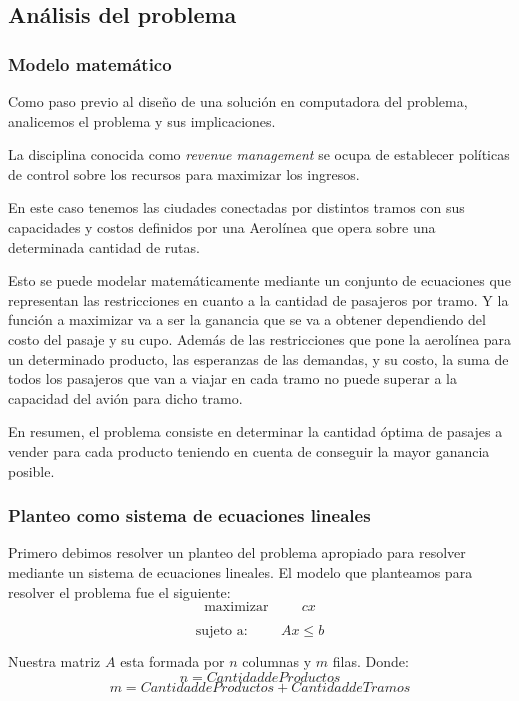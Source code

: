 \subsection{An\'alisis del problema}

\subsubsection{Modelo matem\'atico}

Como paso previo al dise\~no de una soluci\'on en computadora del problema, analicemos el problema y sus implicaciones.

La disciplina conocida como \emph{revenue management} se ocupa de establecer pol\'iticas de control sobre los recursos para maximizar los ingresos.

En este caso tenemos las ciudades conectadas por distintos tramos con sus capacidades y costos definidos por una Aerol\'inea que opera sobre una determinada cantidad de rutas.

Esto se puede modelar matem\'aticamente mediante un conjunto de ecuaciones que representan las restricciones en cuanto a la cantidad de pasajeros por tramo. Y la funci\'on a maximizar va a ser la ganancia que se va a obtener dependiendo del costo del pasaje y su cupo.
Adem\'as de las restricciones que pone la aerol\'inea para un determinado producto, las esperanzas de las demandas, y su costo, la suma de todos los pasajeros que van a viajar en cada tramo no puede superar a la capacidad del avi\'on para dicho tramo.

En resumen, el problema consiste en determinar la cantidad \'optima de pasajes a vender para cada producto teniendo en cuenta de conseguir la mayor ganancia posible.

\subsubsection{Planteo como sistema de ecuaciones lineales}

Primero debimos resolver un planteo del problema apropiado para resolver mediante un sistema de ecuaciones lineales. 
El modelo que planteamos para resolver el problema fue el siguiente:
$$\mbox{maximizar}  \hspace{1cm}   cx$$

$$\mbox{sujeto a:}  \hspace{1cm}   Ax \leq b$$

Nuestra matriz $A$ esta formada por $n$ columnas y $m$ filas. Donde: 
$$n = Cantidad de Productos$$
$$m = Cantidad de Productos + Cantidad de Tramos$$

